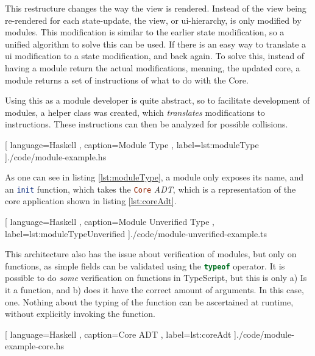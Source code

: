 
This restructure changes the way the view is rendered. Instead of the view being
re-rendered for each state-update, the view, or \gls{ui}-hierarchy, is only
modified by modules. This modification is similar to the earlier state
modification, so a unified algorithm to solve this can be used. If there is an
easy way to translate a \gls{ui} modification to a state modification, and back
again. To solve this, instead of having a module return the actual
modifications, meaning, the updated core, a module returns a set of instructions
of what to do with the Core.

Using this as a module developer is quite abstract, so to facilitate development
of modules, a helper class was created, which \textit{translates} modifications
to instructions. These instructions can then be analyzed for possible
collisions.

\begin{center}
  
   [ language=Haskell
   , caption={Module Type}
   , label=lst:moduleType
   ]{./code/module-example.hs}
\end{center}

As one can see in listing \ref{lst:moduleType}, a module only exposes its name,
and an \lstinline[language=haskell]{init} function, which takes the
\lstinline[language=haskell]{Core} \textit{ADT}, which is a representation of
the core application shown in listing \ref{lst:coreAdt}.

\begin{center}
  
   [ language=Haskell
   , caption={Module Unverified Type}
   , label=lst:moduleTypeUnverified
   ]{./code/module-unverified-example.ts}
\end{center}

This architecture also has the issue about verification of modules, but only on
functions, as simple fields can be validated using the
\lstinline[language=JavaScript]{typeof} operator. It is possible to do
\textit{some} verification on functions in TypeScript, but this is only a) Is it
a function, and b) does it have the correct amount of arguments. In this case,
one. Nothing about the typing of the function can be ascertained at runtime,
without explicitly invoking the function.

\begin{center}
  
    [ language=Haskell
    , caption={Core ADT}
    , label=lst:coreAdt
    ]{./code/module-example-core.hs}
\end{center}

